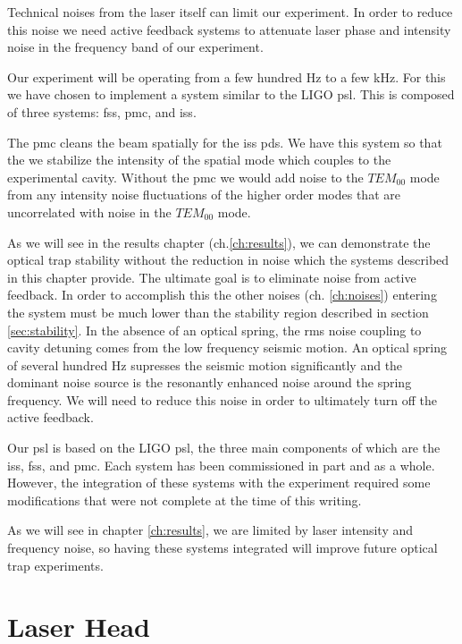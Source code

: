 \acresetall

Technical noises from the laser itself can limit our experiment. \cite{Corbitt07}
In order to reduce this noise we need active feedback systems to attenuate laser
phase and intensity noise in the frequency band of our experiment.

Our experiment will be operating from a few hundred Hz to a few kHz.
For this we have chosen to implement a system similar to the LIGO \ac{psl}.
This is composed of three systems: \ac{fss}, \ac{pmc}, and \ac{iss}.

The \ac{pmc} cleans the beam spatially for the \ac{iss} \ac{pd}s.
We have this system so that the we stabilize the intensity of the spatial mode
which couples to the experimental cavity.
Without the \ac{pmc} we would add noise to the $TEM_{00}$ mode from any
intensity noise fluctuations of the higher order modes that are uncorrelated
with noise in the $TEM_{00}$ mode.

As we will see in the results chapter (ch.\ref{ch:results}), we can demonstrate
the optical trap stability without the reduction in noise which the systems
described in this chapter provide.
The ultimate goal is to eliminate noise from active feedback.
In order to accomplish this the other noises
(ch. \ref{ch:noises}) entering the system must be much lower than the stability
region described in section \ref{sec:stability}.
In the absence of an optical spring, the rms noise coupling to cavity detuning
comes from the low frequency seismic motion.
An optical spring of several hundred Hz supresses the seismic motion
significantly and the dominant noise source is the resonantly enhanced noise
around the spring frequency.
We will need to reduce this noise in order to ultimately turn off the active
feedback.

Our \ac{psl} is based on the LIGO \ac{psl}, the three main components of which
are the \ac{iss}, \ac{fss}, and \ac{pmc}. Each system has been commissioned in
part and as a whole. However, the integration of these systems with the
experiment required some modifications that were not complete at the time of
this writing.

As we will see in chapter \ref{ch:results}, we are limited by laser intensity
and frequency noise, so having these systems integrated will improve
future optical trap experiments.


\section{Laser Head}

